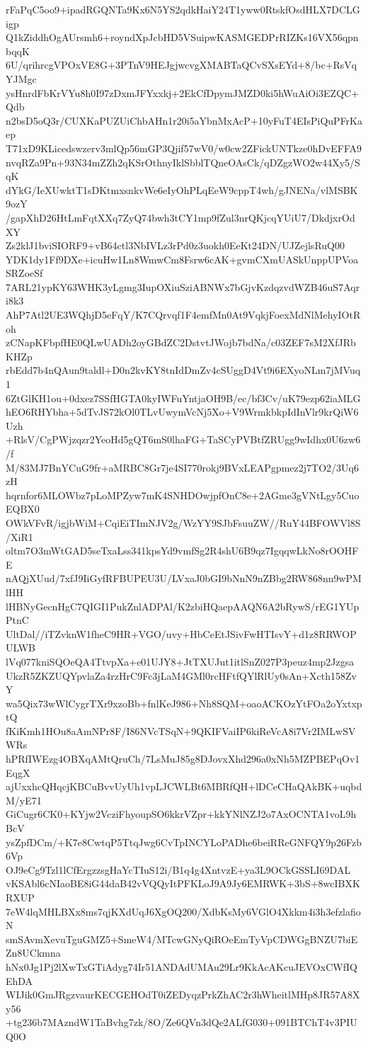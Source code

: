 rFaPqC5oo9+ipadRGQNTa9Kx6N5YS2qdkHaiY24T1yww0RtskfOsdHLX7DCLGigp
Q1kZiddhOgAUrsmh6+royndXpJcbHD5VSuipwKASMGEDPrRIZKs16VX56qpnbqqK
6U/qrihrcgVPOxVE8G+3PTnV9HEJgjwcvgXMABTaQCvSXsEYd+8/bc+RsVqYJMgc
ysHnrdFbKrVYu8h0I97zDxmJFYxxkj+2EkCfDpymJMZD0ki5hWuAiOi3EZQC+Qdb
n2bsD5oQ3r/CUXKaPUZUiChbAHn1r20i5aYbnMxAcP+10yFuT4EIsPiQuPFrKaep
T71xD9KLicedswzerv3mlQp56mGP3Qjif57wV0/w0cw2ZFickUNTkze0hDvEFFA9
nvqRZa9Pn+93N34mZZh2qKSrOthnyIklSbblTQneOAsCk/qDZgzWO2w44Xy5/SqK
dYkG/IeXUwktT1sDKtmxsnkvWe6eIyOhPLqEeW9cppT4wh/gJNENa/vlMSBK9ozY
/gapXhD26HtLmFqtXXq7ZyQ74bwh3tCY1mp9fZul3nrQKjcqYUiU7/DkdjxrOdXY
Zs2klJ1bviSIORF9+vB64ctl3NbIVLz3rPd0z3uokh0EeKt24DN/UJZejlsRuQ00
YDK1dy1Ff9DXe+icuHw1Ln8WmwCm8Fsrw6cAK+gvmCXmUASkUnppUPVoaSRZoeSf
7ARL21ypKY63WHK3yLgmg3IupOXiuSziABNWx7bGjvKzdqzvdWZB46uS7Aqri8k3
AhP7Atl2UE3WQhjD5eFqY/K7CQrvqf1F4emfMn0At9VqkjFoexMdNlMehyIOtRoh
zCNapKFbpfHE0QLwUADh2oyGBdZC2DstvtJWojb7bdNa/c03ZEF7sM2XfJRbKHZp
rbEdd7b4nQAun9taldl+D0n2kvKY8tnIdDmZv4cSUggD4Vt9i6EXyoNLm7jMVuq1
6ZtGlKH1ou+0dxez7SSfHGTA0kyIWFuYntjaOH9B/ec/bf3Cv/uK79ezp62iaMLG
hEO6RHYbha+5dTvJS72kOl0TLvUwymVcNj5Xo+V9WrmkbkpIdInVlr9krQiW6Uzh
+RlsV/CgPWjzqzr2YeoHd5gQT6mS0lhaFG+TaSCyPVBtfZRUgg9wIdhx0U6zw6/f
M/83MJ7BnYCuG9fr+aMRBC8Gr7je4SI770rokj9BVxLEAPgpmez2j7TO2/3Uq6zH
hqrnfor6MLOWbz7pLoMPZyw7mK4SNHDOwjpfOnC8e+2AGme3gVNtLgy5CuoEQBX0
OWkVFvR/igjbWiM+CqiEiTImNJV2g/WzYY9SJbFsuuZW//RuY44BFOWVl8S/XiR1
oltm7O3mWtGAD5seTxaLss341kpsYd9vmfSg2R4shU6B9qz7IgqqwLkNo8rOOHFE
nAQjXUud/7xfJ9IiGyfRFBUPEU3U/LVxaJ0bGI9bNnN9nZBbg2RW868nn9wPMlHH
lHBNyGecnHgC7QIGI1PukZnlADPAl/K2zbiHQaepAAQN6A2bRywS/rEG1YUpPtnC
UltDal//iTZvknW1fheC9HR+VGO/uvy+HbCeEtJSivFwHTIsvY+d1z8RRWOPULWB
lVq077kniSQOeQA4TtvpXa+e01UJY8+JtTXUJut1itlSnZ027P3peuz4mp2Jzgsa
UkzR5ZKZUQYpvlaZa4rzHrC9Fc3jLaM4GMl0rcHFtfQYlRlUy0sAn+Xcth158ZvY
wa5Qix73wWlCygrTXr9xzoBb+fnlKeJ986+Nh8SQM+oaoACKOzYtFOa2oYxtxptQ
fKiKmh1HOu8aAmNPr8F/I86NVcTSqN+9QKIFVaiIP6kiReVcA8i7Vr2IMLwSVWRs
hPRfIWEzg4OBXqAMtQruCh/7LsMuJ85g8DJovxXhd296a0xNh5MZPBEPqOv1EqgX
ajUxxhcQHqcjKBCuBvvUyUh1vpLJCWLBt6MBRfQH+lDCeCHaQAkBK+uqbdM/yE71
GiCugr6CK0+KYjw2VcziFhyoupSO6kkrVZpr+kkYNlNZJ2o7AxOCNTA1voL9hBcV
ysZpfDCm/+K7e8CwtqP5TtqJwg6CvTpINCYLoPADhe6beiRReGNFQY9p26Fzb6Vp
OJ9eCg9Tzl1lCfErgzzsgHaYcTIuS12i/B1q4g4XntvzE+ya3L9OCkGSSLI69DAL
vKSAbl6cNIaoBE8iG44daB42vVQQyItPFKLoJ9A9Jy6EMRWK+3bS+8wcIBXKRXUP
7eW4lqMHLBXx8ms7qjKXdUqJ6XgOQ200/XdbKsMy6VGlO4Xkkm4i3h3efzlafioN
smSAvmXevuTguGMZ5+SmeW4/MTcwGNyQiROeEmTyVpCDWGgBNZU7biEZn8UCkmna
hNx0Jg1Pj2lXwTxGTiAdyg74Ir51ANDAdUMAu29Lr9KkAcAKcuJEVOxCWfIQEhDA
WIJik0GmJRgzvaurKECGEHOdT0iZEDyqzPrkZhAC2r3hWheitlMHp8JR57A8Xy56
+tg236b7MAzndW1TaBvhg7zk/8O/Ze6QVn3dQe2ALfG030+091BTChT4v3PIUQ0O
